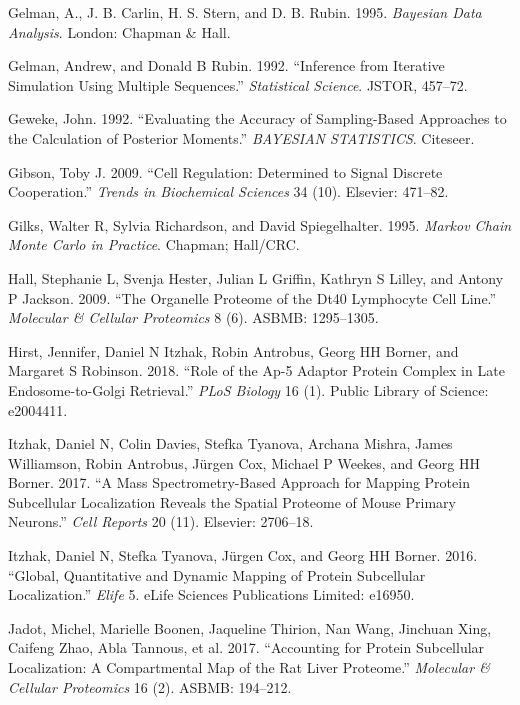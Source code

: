 \documentclass[]{article}
\begin{document}
\hypertarget{ref-Gelman:1995}{}
Gelman, A., J. B. Carlin, H. S. Stern, and D. B. Rubin. 1995.
\emph{Bayesian Data Analysis}. London: Chapman \& Hall.

\hypertarget{ref-Gelman:1992}{}
Gelman, Andrew, and Donald B Rubin. 1992. ``Inference from Iterative
Simulation Using Multiple Sequences.'' \emph{Statistical Science}.
JSTOR, 457--72.

\hypertarget{ref-Geweke:1992}{}
Geweke, John. 1992. ``Evaluating the Accuracy of Sampling-Based
Approaches to the Calculation of Posterior Moments.'' \emph{BAYESIAN
STATISTICS}. Citeseer.

\hypertarget{ref-Gibson:2009}{}
Gibson, Toby J. 2009. ``Cell Regulation: Determined to Signal Discrete
Cooperation.'' \emph{Trends in Biochemical Sciences} 34 (10). Elsevier:
471--82.

\hypertarget{ref-Gilks:1995}{}
Gilks, Walter R, Sylvia Richardson, and David Spiegelhalter. 1995.
\emph{Markov Chain Monte Carlo in Practice}. Chapman; Hall/CRC.

\hypertarget{ref-Hall:2009}{}
Hall, Stephanie L, Svenja Hester, Julian L Griffin, Kathryn S Lilley,
and Antony P Jackson. 2009. ``The Organelle Proteome of the Dt40
Lymphocyte Cell Line.'' \emph{Molecular \& Cellular Proteomics} 8 (6).
ASBMB: 1295--1305.

\hypertarget{ref-Hirst:2018}{}
Hirst, Jennifer, Daniel N Itzhak, Robin Antrobus, Georg HH Borner, and
Margaret S Robinson. 2018. ``Role of the Ap-5 Adaptor Protein Complex in
Late Endosome-to-Golgi Retrieval.'' \emph{PLoS Biology} 16 (1). Public
Library of Science: e2004411.

\hypertarget{ref-Itzhak:2017}{}
Itzhak, Daniel N, Colin Davies, Stefka Tyanova, Archana Mishra, James
Williamson, Robin Antrobus, Jürgen Cox, Michael P Weekes, and Georg HH
Borner. 2017. ``A Mass Spectrometry-Based Approach for Mapping Protein
Subcellular Localization Reveals the Spatial Proteome of Mouse Primary
Neurons.'' \emph{Cell Reports} 20 (11). Elsevier: 2706--18.

\hypertarget{ref-Itzhak:2016}{}
Itzhak, Daniel N, Stefka Tyanova, Jürgen Cox, and Georg HH Borner. 2016.
``Global, Quantitative and Dynamic Mapping of Protein Subcellular
Localization.'' \emph{Elife} 5. eLife Sciences Publications Limited:
e16950.

\hypertarget{ref-Jadot:2017}{}
Jadot, Michel, Marielle Boonen, Jaqueline Thirion, Nan Wang, Jinchuan
Xing, Caifeng Zhao, Abla Tannous, et al. 2017. ``Accounting for Protein
Subcellular Localization: A Compartmental Map of the Rat Liver
Proteome.'' \emph{Molecular \& Cellular Proteomics} 16 (2). ASBMB:
194--212.
\end{document}
